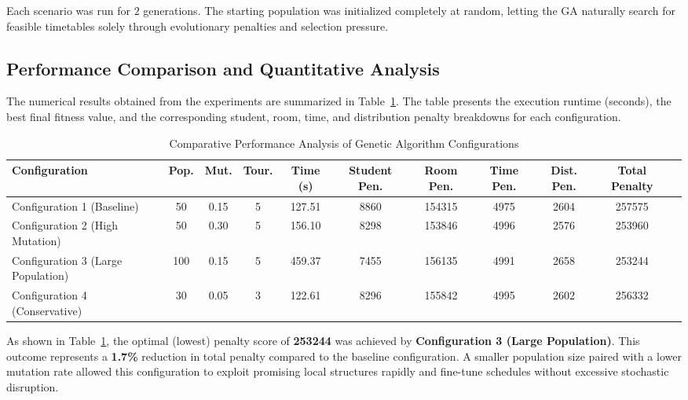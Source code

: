 Each scenario was run for $2$ generations. The starting population was initialized completely at random, letting the GA naturally search for feasible timetables solely through evolutionary penalties and selection pressure.

\subsection{Performance Comparison and Quantitative Analysis}
\label{subsec:performance_comparisons}

The numerical results obtained from the experiments are summarized in Table~\ref{tab:ga_experiments}. The table presents the execution runtime (seconds), the best final fitness value, and the corresponding student, room, time, and distribution penalty breakdowns for each configuration.

\begin{table}[htbp]
\centering
\caption{Comparative Performance Analysis of Genetic Algorithm Configurations}
\label{tab:ga_experiments}
\begin{tabular}{lcccccccccr}
\hline
\textbf{Configuration} & \textbf{Pop.} & \textbf{Mut.} & \textbf{Tour.} & \textbf{Time (s)} & \textbf{Student Pen.} & \textbf{Room Pen.} & \textbf{Time Pen.} & \textbf{Dist. Pen.} & \textbf{Total Penalty} \\ \hline
Configuration 1 (Baseline) & 50 & 0.15 & 5 & 127.51 & 8860 & 154315 & 4975 & 2604 & 257575 \\
Configuration 2 (High Mutation) & 50 & 0.30 & 5 & 156.10 & 8298 & 153846 & 4996 & 2576 & 253960 \\
Configuration 3 (Large Population) & 100 & 0.15 & 5 & 459.37 & 7455 & 156135 & 4991 & 2658 & 253244 \\
Configuration 4 (Conservative) & 30 & 0.05 & 3 & 122.61 & 8296 & 155842 & 4995 & 2602 & 256332 \\ \hline
\end{tabular}
\end{table}

As shown in Table~\ref{tab:ga_experiments}, the optimal (lowest) penalty score of \textbf{253244} was achieved by \textbf{Configuration 3 (Large Population)}. This outcome represents a \textbf{1.7\%} reduction in total penalty compared to the baseline configuration. A smaller population size paired with a lower mutation rate allowed this configuration to exploit promising local structures rapidly and fine-tune schedules without excessive stochastic disruption.

